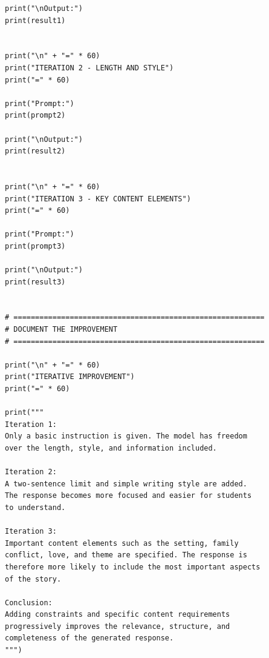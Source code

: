 \documentclass[10pt,a4paper]{article}
\begin{document}
\begin{lstlisting}[style=code]
print("\nOutput:")
print(result1)


print("\n" + "=" * 60)
print("ITERATION 2 - LENGTH AND STYLE")
print("=" * 60)

print("Prompt:")
print(prompt2)

print("\nOutput:")
print(result2)


print("\n" + "=" * 60)
print("ITERATION 3 - KEY CONTENT ELEMENTS")
print("=" * 60)

print("Prompt:")
print(prompt3)

print("\nOutput:")
print(result3)


# ==========================================================
# DOCUMENT THE IMPROVEMENT
# ==========================================================

print("\n" + "=" * 60)
print("ITERATIVE IMPROVEMENT")
print("=" * 60)

print("""
Iteration 1:
Only a basic instruction is given. The model has freedom
over the length, style, and information included.

Iteration 2:
A two-sentence limit and simple writing style are added.
The response becomes more focused and easier for students
to understand.

Iteration 3:
Important content elements such as the setting, family
conflict, love, and theme are specified. The response is
therefore more likely to include the most important aspects
of the story.

Conclusion:
Adding constraints and specific content requirements
progressively improves the relevance, structure, and
completeness of the generated response.
""")
\end{lstlisting}
\end{document}
